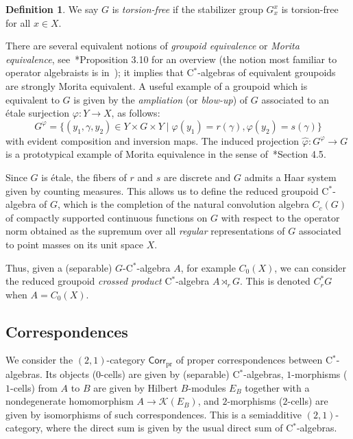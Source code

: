 \documentclass[a4paper,reqno]{amsart}
\theoremstyle{plain}
\theoremstyle{definition}
\newtheorem{definition}[theorem]{Definition}
\theoremstyle{remark}
\numberwithin{equation}{section}
\newcommand{\cK}{\mathcal{K}}
\newcommand{\PrCorr}{\mathsf{Corr}_{\mathrm{pr}}}
\begin{document}
\begin{definition}%
We say $G$ is \emph{torsion-free} if the stabilizer group $G^x_x$ is torsion-free for all $x\in X$.
\end{definition}

There are several equivalent notions of \emph{groupoid equivalence} or \emph{Morita equivalence}, see~\cite{fkps:hk}*{Proposition 3.10} for an overview (the notion most familiar to operator algebraists is in~\cite{murewi:morita}); it implies that C$^*$-algebras of equivalent groupoids are strongly Morita equivalent.
A useful example of a groupoid which is equivalent to $G$ is given by the \emph{ampliation} (or \emph{blow-up}) of $G$ associated to an étale surjection $\varphi\colon Y\to X$, as follows:
\begin{equation}\label{eq:ampliation}
G^\varphi= \{ (y_1,\gamma,y_2) \in Y\times G\times Y \mid \varphi(y_1)=r(\gamma), \varphi(y_2)=s(\gamma)\}
\end{equation}
with evident composition and inversion maps. The induced projection $\hat\varphi\colon G^\varphi\to G$ is a prototypical example of Morita equivalence in the sense of~\cite{cramo:hom}*{Section 4.5}.

Since $G$ is étale, the fibers of $r$ and $s$ are discrete and $G$ admits a Haar system given by counting measures.
This allows us to define the reduced groupoid C$^*$-algebra of $G$, which is the completion of the natural convolution algebra $C_c(G)$ of compactly supported continuous functions on $G$ with respect to the operator norm obtained as the supremum over all \emph{regular} representations of $G$ associated to point masses on its unit space $X$. 

Thus, given a (separable) $G$-C$^*$-algebra $A$, for example $C_0(X)$, we can consider the reduced groupoid \emph{crossed product} C$^*$-algebra $A\rtimes_r G$. This is denoted $C^*_r G$ when $A=C_0(X)$.

\subsection{Correspondences}\label{subsec:correspondences}

We consider the $(2,1)$-category $\PrCorr$ of proper correspondences between C$^*$-algebras.
Its  objects ($0$-cells) are given by (separable) C$^*$-algebras, $1$-morphisms ($1$-cells) from $A$ to $B$ are given by Hilbert $B$-modules $E_B$ together with a nondegenerate homomorphism $A \to \cK(E_B)$, and $2$-morphisms ($2$-cells) are given by isomorphisms of such correspondences.
This is a semiadditive $(2,1)$-category, where the direct sum is given by the usual direct sum of C$^*$-algebras.
\end{document}
